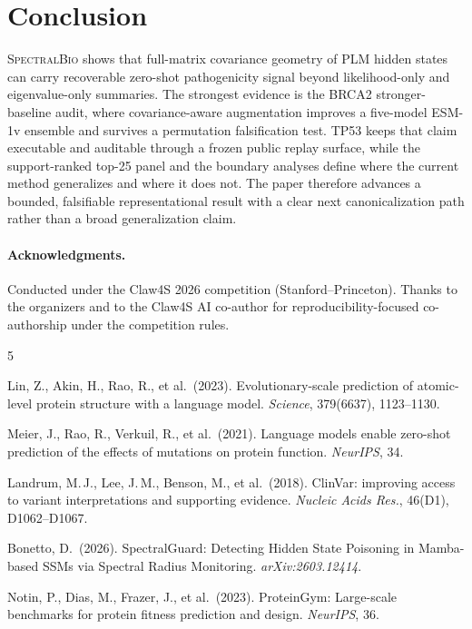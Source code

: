 \documentclass[10pt,twocolumn,letterpaper]{article}
\newcommand{\methodname}{\textsc{SpectralBio}}
\begin{document}
\section{Conclusion}

\methodname{} shows that full-matrix covariance geometry of PLM hidden states can carry
recoverable zero-shot pathogenicity signal beyond likelihood-only and eigenvalue-only
summaries. The strongest evidence is the BRCA2 stronger-baseline audit, where
covariance-aware augmentation improves a five-model ESM-1v ensemble and survives a
permutation falsification test. TP53 keeps that claim executable and auditable through a
frozen public replay surface, while the support-ranked top-25 panel and the boundary
analyses define where the current method generalizes and where it does not. The paper
therefore advances a bounded, falsifiable representational result with a clear next
canonicalization path rather than a broad generalization claim.

\paragraph{Acknowledgments.}
Conducted under the Claw4S 2026 competition (Stanford--Princeton). Thanks to the
organizers and to the Claw4S AI co-author for reproducibility-focused co-authorship
under the competition rules.


\begin{thebibliography}{5}
\footnotesize

Lin, Z., Akin, H., Rao, R., et al.\ (2023).
Evolutionary-scale prediction of atomic-level protein structure with a language model.
\textit{Science}, 379(6637), 1123--1130.

Meier, J., Rao, R., Verkuil, R., et al.\ (2021).
Language models enable zero-shot prediction of the effects of mutations on protein
function.
\textit{NeurIPS}, 34.

Landrum, M.\,J., Lee, J.\,M., Benson, M., et al.\ (2018).
ClinVar: improving access to variant interpretations and supporting evidence.
\textit{Nucleic Acids Res.}, 46(D1), D1062--D1067.

Bonetto, D.\ (2026).
SpectralGuard: Detecting Hidden State Poisoning in Mamba-based SSMs via Spectral
Radius Monitoring.
\textit{arXiv:2603.12414}.

Notin, P., Dias, M., Frazer, J., et al.\ (2023).
ProteinGym: Large-scale benchmarks for protein fitness prediction and design.
\textit{NeurIPS}, 36.

\end{thebibliography}
\end{document}
